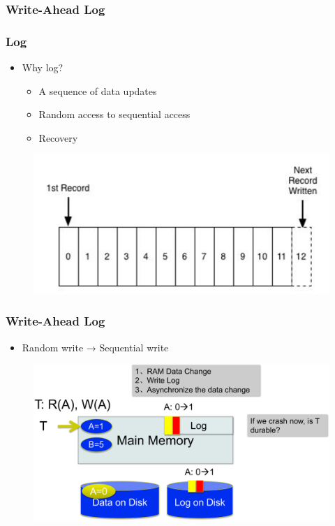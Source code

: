 \subsubsection{Write-Ahead Log}

\begin{frame}[fragile]
	\frametitle{Log}
	\begin{itemize}
		\item Why log?
		\begin{itemize}
			\item A sequence of data updates
			\item Random access to sequential access
			\item Recovery
		\end{itemize}
	\end{itemize}
	\begin{figure}
		\includegraphics[width=.65\linewidth]{figs/dbfile-log.png}
	\end{figure}
\end{frame}

\begin{frame}[fragile]
	\frametitle{Write-Ahead Log}
	\begin{itemize}
		\item Random write → Sequential write
	\end{itemize}
	\begin{figure}
		\includegraphics[width=.68\linewidth]{figs/dbfile-wal1.pdf}
	\end{figure}
\end{frame}

